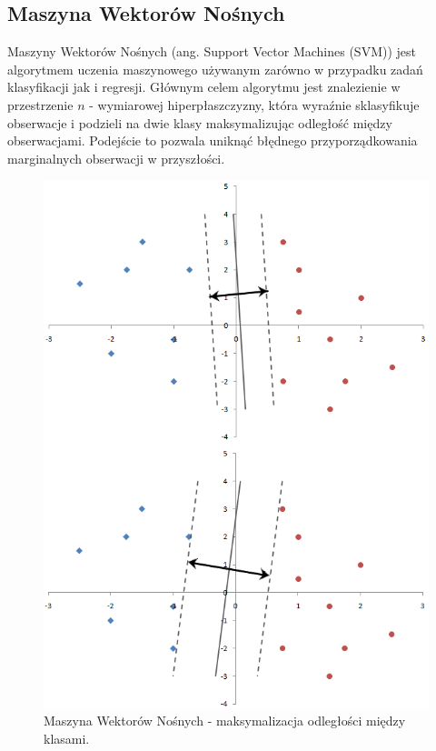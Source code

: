 \documentclass[12pt,a4paper]{report}
\begin{document}
\subsection{Maszyna Wektorów Nośnych}
Maszyny Wektorów Nośnych (ang. Support Vector Machines (SVM)) jest algorytmem uczenia maszynowego używanym zarówno w przypadku zadań klasyfikacji jak i regresji. Głównym celem algorytmu jest znalezienie w przestrzenie $n$ - wymiarowej hiperpłaszczyzny, która wyraźnie sklasyfikuje obserwacje i podzieli na dwie klasy maksymalizując odległość między obserwacjami. Podejście to pozwala uniknąć błędnego przyporządkowania marginalnych obserwacji w przyszłości.
\begin{center}
\begin{figure}[H]
\centering
\includegraphics[scale=0.5]{SVM.PNG} 
\caption{Maszyna Wektorów Nośnych - maksymalizacja odległości między klasami.}
\end{figure}
\end{center}
\end{document}
